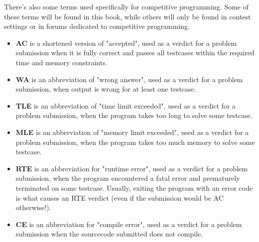 There's also some terms used specifically for competitive programming. Some of these terms will be found in this book, while others will only be found in contest settings or in forums dedicated to competitive programming.

\begin{itemize}
\item \textbf{AC} is a shortened version of "accepted", used as a verdict for a problem submission when it is fully correct and passes all testcases within the required time and memory constraints.
\item \textbf{WA} is an abbreviation of "wrong answer", used as a verdict for a problem submission, when output is wrong for at least one testcase.
\item \textbf{TLE} is an abbreviation of "time limit exceeded", used as a verdict for a problem submission, when the program takes too long to solve some testcase.
\item \textbf{MLE} is an abbreviation of "memory limit exceeded", used as a verdict for a problem submission, when the program takes too much memory to solve some testcase.
\item \textbf{RTE} is an abbreviation for "runtime error", used as a verdict for a problem submission, when the program encountered a fatal error and prematurely terminated on some testcase. Usually, exiting the program with an error code is what causes an RTE verdict (even if the submission would be AC otherwise!).
\item \textbf{CE} is an abbreviation for "compile error", used as a verdict for a problem submission when the sourcecode submitted does not compile.
\end{itemize}